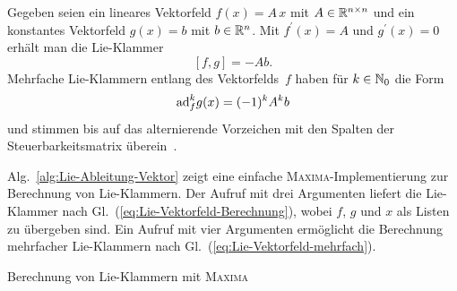 \begin{example}
\label{exa:Lie-Vektorfeld-linear-konstant}Gegeben seien ein lineares
Vektorfeld $f(x)=A\,x$ mit $A\in{\mathbb{R}}^{n\times n}$ und ein konstantes
Vektorfeld $g(x)=b$ mit $b\in{\mathbb{R}}^{n}$. Mit $f^{\prime}(x)=A$ und
$g^{\prime}(x)=0$ erhält man die Lie-Klammer 
\[
[f,g]=-Ab.
\]
Mehrfache Lie-Klammern entlang des Vektorfelds~$f$ haben für $k\in{\mathbb{N}_0}$
die Form 
\[
{\operatorname{ad}}_{f}^{k}g(x)=(-1)^{k}A^{k}b
\]
und stimmen bis auf das alternierende Vorzeichen mit den Spalten der
Steuerbarkeitsmatrix überein~\cite{lunze-rt2}.
\end{example}
Alg.~\ref{alg:Lie-Ableitung-Vektor} zeigt eine einfache \textsc{Maxima}-Implementierung
zur Berechnung von Lie-Klammern. Der Aufruf mit drei Argumenten liefert
die Lie-Klammer nach Gl.~(\ref{eq:Lie-Vektorfeld-Berechnung}), wobei
$f$, $g$ und $x$ als Listen zu übergeben sind. Ein Aufruf mit vier
Argumenten ermöglicht die Berechnung mehrfacher Lie-Klammern nach
Gl.~(\ref{eq:Lie-Vektorfeld-mehrfach}).

\begin{algorithm}


\caption{Berechnung von Lie-Klammern mit \textsc{Maxima\label{alg:Lie-Ableitung-Vektor}}}
\end{algorithm}

